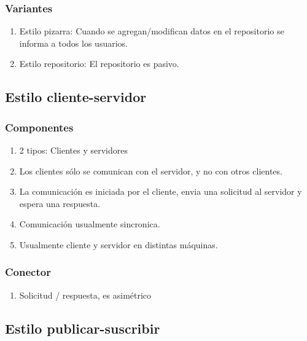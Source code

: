     \subsubsection{Variantes}
    \begin{enumerate}[-]
      \item Estilo pizarra: Cuando se agregan/modifican datos en el repositorio se informa a todos los usuarios.
      \item Estilo repositorio: El repositorio es pasivo.
    \end{enumerate}

  \subsection{Estilo cliente-servidor}

    \subsubsection{Componentes}
    \begin{enumerate}[-]
      \item 2 tipos: Clientes y servidores
      \item Los clientes sólo se comunican con el servidor, y no con otros clientes.
      \item La comunicación es iniciada por el cliente, envia una solicitud al servidor y espera una respuesta.
      \item Comunicación usualmente sincronica.
      \item Usualmente cliente y servidor en distintas máquinas.
    \end{enumerate}

    \subsubsection{Conector}
    \begin{enumerate}[-]
      \item Solicitud / respuesta, es asimétrico
    \end{enumerate}


  \subsection{Estilo publicar-suscribir}
  

